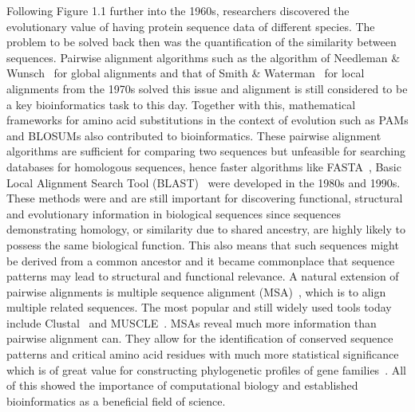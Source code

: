 Following Figure 1.1 further into the 1960s, researchers discovered the evolutionary value of having protein sequence data of different species. The problem to be solved back then was the quantification of the similarity between sequences. Pairwise alignment algorithms such as the algorithm of Needleman \& Wunsch~\cite{global} for global alignments and that of Smith \& Waterman~\cite{local} for local alignments from the 1970s solved this issue and alignment is still considered to be a key bioinformatics task to this day. Together with this, mathematical frameworks for amino acid substitutions in the context of evolution such as PAMs and BLOSUMs also contributed to bioinformatics. These pairwise alignment algorithms are sufficient for comparing two sequences but unfeasible for searching databases for homologous sequences, hence faster algorithms like FASTA~\cite{fasta}, Basic Local Alignment Search Tool (BLAST)~\cite{blast} were developed in the 1980s and 1990s. These methods were and are still important for discovering functional, structural and evolutionary information in biological sequences since sequences demonstrating homology, or similarity due to shared ancestry, are highly likely to possess the same biological function. This also means that such sequences might be derived from a common ancestor and it became commonplace that sequence patterns may lead to structural and functional relevance. A natural extension of pairwise alignments is multiple sequence alignment (MSA)~\cite{msa}, which is to align multiple related sequences. The most popular and still widely used tools today include Clustal~\cite{clustal} and MUSCLE~\cite{muscle}. MSAs reveal much more information than pairwise alignment can. They allow for the identification of conserved sequence patterns and critical amino acid residues with much more statistical significance which is of great value for constructing phylogenetic profiles of gene families~\cite{phylo}. All of this showed the importance of computational biology and established bioinformatics as a beneficial field of science.

